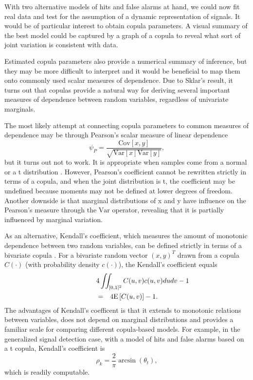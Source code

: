 \documentclass[12pt]{report}
\begin{document}
With two alternative models of hits and false alarms at hand, we could now fit real data and test for the assumption of a dynamic representation of signals. It would be of particular interest to obtain copula parameters. A visual summary of the best model could be captured by a graph of a copula to reveal what sort of joint variation is consistent with data. 

Estimated copula parameters also provide a numerical summary of inference, but they may be more difficult to interpret and it would be beneficial to map them onto commonly used scalar measures of dependence. Due to Sklar's result, it turns out that copulas provide a natural way for deriving several important measures of dependence between random variables, regardless of univariate marginals. 

The most likely attempt at connecting copula parameters to common measures of dependence may be through Pearson's scalar measure of linear dependence 
\begin{equation}
\psi_P = \frac{\mathrm{Cov}\left[x, y\right]}{\sqrt{\mathrm{Var}\left[x\right]\mathrm{Var}\left[y\right]}},
\end{equation}
but it turns out not to work.
It is appropriate when samples come from a normal or a t distribution \citep{CasBer2002}. However, Pearson's coefficient cannot be rewritten strictly in terms of a copula, and when the joint distribution is t, the coefficient may be undefined because moments may not be defined at lower degrees of freedom. Another downside is that marginal distributions of x and y have influence on the Pearson's measure through the $\mathrm{Var}$ operator, revealing that it is partially influenced by marginal variation.

As an alternative, Kendall's  coefficient, which
measures the amount of monotonic dependence between two random variables,
can be defined strictly in terms of a bivariate copula \citep{Joe1997,Nel2007}.  For a bivariate random vector $(x, y)^T$ drawn from a copula $C(\cdot)$ (with probability density $c(\cdot)$), the Kendall's coefficient equals
\begin{eqnarray}
\lefteqn{4 \iint_{[0,1]^2}C(u,v)c(u,v)dudv - 1} \nonumber \\ 
& = & 4 \mathrm{E}\left[C(u,v)\right] - 1.
\end{eqnarray}
The advantages of Kendall's coefficent is that it extends to monotonic relations between variables, does not depend on marginal distributions and provides a familiar scale for comparing different copula-based models. For example, in the generalized signal detection case, with a model of hits and false alarms based on a t copula, Kendall's coefficient is
\begin{equation}
\label{kend_dep}
\rho_k = \frac{2}{\pi}\arcsin(\theta_t),
\end{equation}
which is readily computable.
\end{document}
